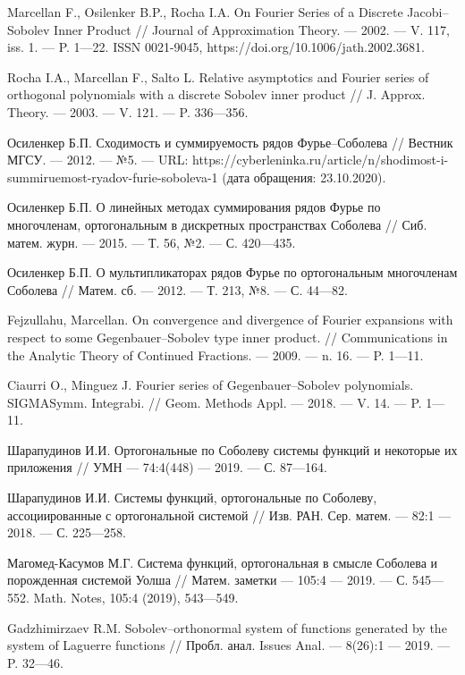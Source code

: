 \begin{thebibliography}{111}
Marcellan F., Osilenker B.P., Rocha I.A.
On Fourier Series of a Discrete Jacobi--Sobolev Inner Product
//
Journal of Approximation Theory.
--- 2002.
--- V. 117, iss. 1.
--- P. 1---22.
ISSN 0021-9045, https://doi.org/10.1006/jath.2002.3681.

Rocha I.A., Marcellan F., Salto L.
Relative asymptotics and Fourier series of orthogonal polynomials with a discrete Sobolev inner product
//
J. Approx. Theory.
--- 2003.
--- V. 121.
--- P. 336---356.

Осиленкер Б.П.
Сходимость и суммируемость рядов Фурье--Соболева
//
Вестник МГСУ.
--- 2012.
--- №5.
--- URL: https://cyberleninka.ru/article/n/shodimost-i-summiruemost-ryadov-furie-soboleva-1 (дата обращения: 23.10.2020).

Осиленкер Б.П.
О линейных методах суммирования рядов Фурье по многочленам, ортогональным в дискретных пространствах Соболева
//
Сиб. матем. журн.
--- 2015.
--- Т. 56, №2.
--- С. 420---435.	

Осиленкер Б.П.
О мультипликаторах рядов Фурье по ортогональным многочленам Соболева
//
Матем. сб.
--- 2012.
--- Т. 213, №8.
--- С. 44---82.	

Fejzullahu, Marcellan.
On convergence and divergence of Fourier expansions with respect to some Gegenbauer--Sobolev type inner product.
//
Communications in the Analytic Theory of Continued Fractions.
--- 2009.
--- n. 16.
--- P. 1---11.

Ciaurri O., Minguez J.
Fourier series of Gegenbauer--Sobolev polynomials. SIGMASymm. Integrabi.
//
Geom. Methods Appl.
--- 2018.
--- V. 14.
--- P. 1---11.

Шарапудинов И.И.
Ортогональные по Соболеву системы функций и некоторые их приложения
//
УМН
--- 74:4(448)
--- 2019.
--- С. 87---164.

Шарапудинов И.И.
Системы функций, ортогональные по Соболеву, ассоциированные с ортогональной системой
//
Изв. РАН. Сер. матем.
--- 82:1
--- 2018.
--- С. 225---258.

Магомед-Касумов М.Г.
Система функций, ортогональная в смысле Соболева и порожденная системой Уолша
//
Матем. заметки
--- 105:4
--- 2019.
--- С. 545---552.
Math. Notes, 105:4 (2019), 543---549.

Gadzhimirzaev R.M.
Sobolev--orthonormal system of functions generated by the system of Laguerre functions
//
Пробл. анал. Issues Anal.
--- 8(26):1
--- 2019.
--- P. 32---46.


\end{thebibliography}
